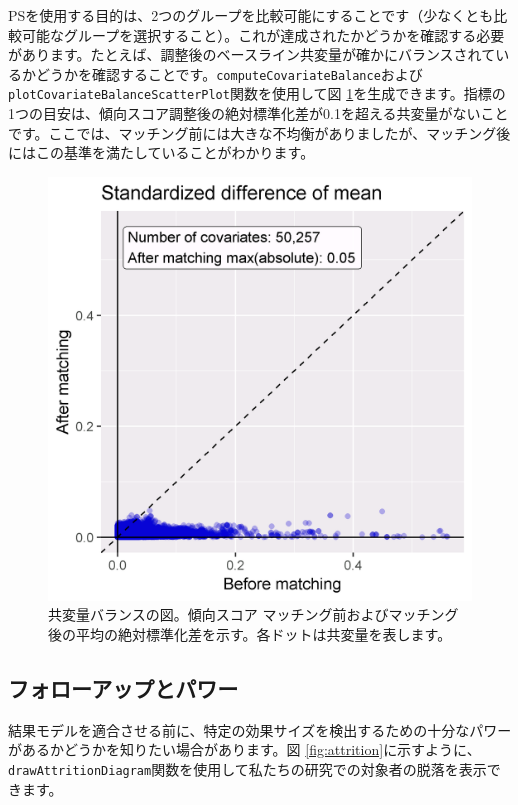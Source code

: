 \documentclass[
  11pt]{book}
\theoremstyle{definition}
\theoremstyle{definition}
\theoremstyle{definition}
\theoremstyle{definition}
\theoremstyle{remark}
\begin{document}
PSを使用する目的は、2つのグループを比較可能にすることです（少なくとも比較可能なグループを選択すること）。これが達成されたかどうかを確認する必要があります。たとえば、調整後のベースライン共変量が確かにバランスされているかどうかを確認することです。\texttt{computeCovariateBalance}および\texttt{plotCovariateBalanceScatterPlot}関数を使用して図 \ref{fig:balance}を生成できます。指標の1つの目安は、傾向スコア調整後の絶対標準化差が0.1を超える共変量がないことです。ここでは、マッチング前には大きな不均衡がありましたが、マッチング後にはこの基準を満たしていることがわかります。 

\begin{figure}

{\centering \includegraphics[width=0.7\linewidth]{images/PopulationLevelEstimation/balance} 

}

\caption{共変量バランスの図。傾向スコア マッチング前およびマッチング後の平均の絶対標準化差を示す。各ドットは共変量を表します。}\label{fig:balance}
\end{figure}

\subsection{フォローアップとパワー}\label{ux30d5ux30a9ux30edux30fcux30a2ux30c3ux30d7ux3068ux30d1ux30efux30fc}

結果モデルを適合させる前に、特定の効果サイズを検出するための十分なパワーがあるかどうかを知りたい場合があります。図 \ref{fig:attrition}に示すように、\texttt{drawAttritionDiagram}関数を使用して私たちの研究での対象者の脱落を表示できます。 
\end{document}
